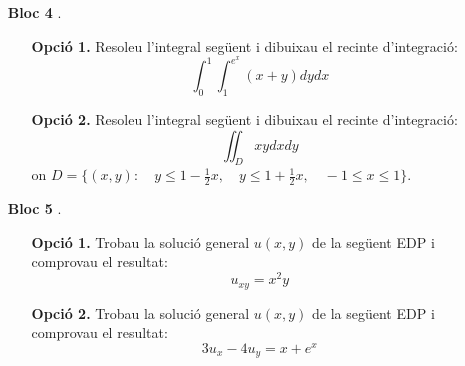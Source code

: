 \documentclass[12pt]{report}
\begin{document}
\begin{enumerate}
\vskip 0.3cm


\item[\textbf{Bloc 4}]. 

\begin{enumerate}
\item[
\textbf{Opció 1.}]  Resoleu l'integral següent i dibuixau el recinte d'integració:
\[
\int_0^1 \int_1^{e^x} (x+y) dy dx
\]
\item[
\textbf{Opció 2.}]   Resoleu l'integral següent i dibuixau el recinte d'integració:
\[
\iint_D xy dxdy
\]
on $D=\{ (x, y) : \quad y \leq 1-\frac{1}{2}x , \quad y \leq 1+\frac{1}{2}x, \quad -1 \leq x \leq 1 \}$.
\end{enumerate}

\vskip 0.3cm


\item[\textbf{Bloc 5}].

\begin{enumerate}
\item[
\textbf{Opció 1.}] Trobau la solució general $u(x, y)$ de la següent EDP i comprovau el resultat:
\[
u_{xy}=x^2y
\]
\item[
\textbf{Opció 2.}]   Trobau la solució general $u(x, y)$ de la següent EDP i comprovau el resultat:
\[
3u_x-4u_y=x+e^x
\]
\end{enumerate}

\end{enumerate}
\end{document}
